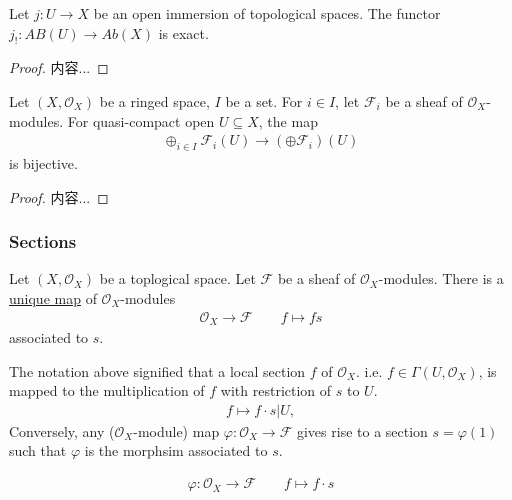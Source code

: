 \documentclass[Total.tex]{subfiles}
\begin{document}
			\begin{lemma}
				Let $j:U\rightarrow X$ be an open immersion of topological spaces. The functor $j_!:AB(U)\rightarrow Ab(X)$ is exact.
			\end{lemma}
			\begin{proof}
				内容...
			\end{proof}
			
			\begin{lemma}
				Let $(X,\mathcal{O}_X)$ be a ringed space, $I$ be a set. For $i\in I$, let $\mathcal{F}_i$ be a sheaf of $\mathcal{O}_X$-modules. For quasi-compact open $U\subseteq X$, the map
				\begin{gather*}
					\oplus_{i\in I} \mathcal{F}_i(U)\rightarrow (\oplus \mathcal{F}_i)(U)
				\end{gather*}
				is bijective.
			\end{lemma}
			\begin{proof}
				内容...
			\end{proof}
		
		
		\subsubsection{Sections}
		
			\begin{Def}
				
				Let $(X,\mathcal{O}_X)$ be a toplogical space. Let $\mathcal{F}$ be a sheaf of $\mathcal{O}_X$-modules. There is a \underline{unique map} of $\mathcal{O}_X$-modules
				\begin{gather*}
					\mathcal{O}_X\rightarrow \mathcal{F}\qquad f\mapsto fs
				\end{gather*}
				associated to $s$. 
			\end{Def}
			
			The notation above signified that a local section $f$ of $\mathcal{O}_X$. i.e. $f\in \Gamma(U,\mathcal{O}_X)$, is mapped to the multiplication of $f$ with restriction of $s$ to $U$. 
			\begin{gather*}
				f\mapsto f\cdot s|U,
			\end{gather*}
			Conversely, any ($\mathcal{O}_X$-module) map $\varphi:\mathcal{O}_X\rightarrow \mathcal{F}$ gives rise to a section $s=\varphi(1)$ such that $\varphi$ is the morphsim associated to $s$.
			
			\begin{gather*}
				\varphi:\mathcal{O}_X\rightarrow \mathcal{F}\qquad f\mapsto f\cdot s
			\end{gather*}
			
\end{document}
